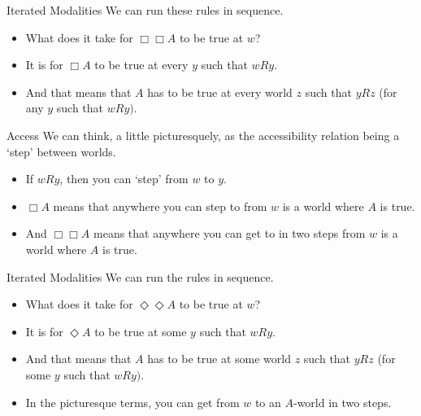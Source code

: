 \documentclass[
  ignorenonframetext,
]{beamer}
\providecommand{\tightlist}{%
  \setlength{\itemsep}{0pt}\setlength{\parskip}{0pt}}
\renewcommand{\,}{\text{, }}
\begin{document}
\begin{frame}{Iterated Modalities}
\protect\hypertarget{iterated-modalities}{}
We can run these rules in sequence.\pause

\begin{itemize}
\tightlist
\item
  What does it take for \(\Box \Box A\) to be true at \(w\)? \pause
\item
  It is for \(\Box A\) to be true at every \(y\) such that
  \(wRy\).\pause
\item
  And that means that \(A\) has to be true at every world \(z\) such
  that \(yRz\) (for any \(y\) such that \(wRy)\).
\end{itemize}
\end{frame}

\begin{frame}{Access}
\protect\hypertarget{access}{}
We can think, a little picturesquely, as the accessibility relation
being a `step' between worlds.

\begin{itemize}
\tightlist
\item
  If \(wRy\), then you can `step' from \(w\) to \(y\).\pause
\item
  \(\Box A\) means that anywhere you can step to from \(w\) is a world
  where \(A\) is true.\pause
\item
  And \(\Box \Box A\) means that anywhere you can get to in two steps
  from \(w\) is a world where \(A\) is true.
\end{itemize}
\end{frame}

\begin{frame}{Iterated Modalities}
\protect\hypertarget{iterated-modalities-1}{}
We can run the rules in sequence.\pause

\begin{itemize}
\tightlist
\item
  What does it take for \(\Diamond \Diamond A\) to be true at \(w\)?
  \pause
\item
  It is for \(\Diamond A\) to be true at some \(y\) such that
  \(wRy\).\pause
\item
  And that means that \(A\) has to be true at some world \(z\) such that
  \(yRz\) (for some \(y\) such that \(wRy)\).\pause
\item
  In the picturesque terms, you can get from \(w\) to an \(A\)-world in
  two steps.
\end{itemize}
\end{frame}
\end{document}
